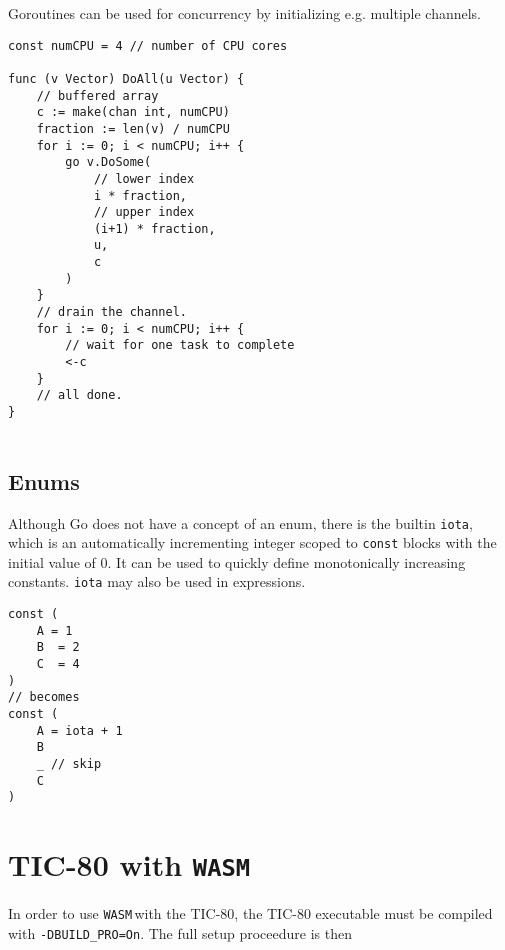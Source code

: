 \documentclass{article}
\newcommand{\WASM}{\texttt{WASM}\,}
\begin{document}
\begin{paracol}{2}
\noindent Goroutines can be used for concurrency by initializing e.g. multiple channels. 

\switchcolumn

\begin{lstlisting}
const numCPU = 4 // number of CPU cores

func (v Vector) DoAll(u Vector) {
    // buffered array
    c := make(chan int, numCPU) 
    fraction := len(v) / numCPU
    for i := 0; i < numCPU; i++ {
        go v.DoSome(
            // lower index
            i * fraction, 
            // upper index
            (i+1) * fraction, 
            u, 
            c
        )
    }
    // drain the channel.
    for i := 0; i < numCPU; i++ {
        // wait for one task to complete
        <-c 
    }
    // all done.
}
    
\end{lstlisting}

\switchcolumn*
\end{paracol}

\subsection{Enums}

\begin{paracol}{2}
Although Go does not have a concept of an enum, there is the builtin \lstinline|iota|, which is an automatically incrementing integer scoped to \lstinline|const| blocks with the initial value of 0. It can be used to quickly define monotonically increasing constants. \lstinline|iota| may also be used in expressions.

\switchcolumn

\begin{lstlisting}
const (
    A = 1
    B  = 2
    C  = 4
)
// becomes
const (
	A = iota + 1
	B
    _ // skip
	C
)
\end{lstlisting}

\end{paracol}

\section{TIC-80 with \WASM}

\noindent In order to use \WASM with the TIC-80, the TIC-80 executable must be compiled with \lstinline|-DBUILD_PRO=On|. The full setup proceedure is then
\\
\end{document}
